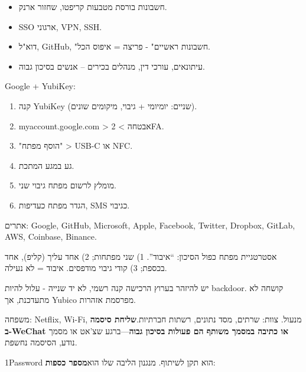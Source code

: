 
\begin{itemize}
  \item חשבונות בורסת מטבעות קריפטו, שחזור ארנק.
  \item SSO ארגוני, VPN, SSH.
  \item דוא"ל, GitHub, "חשבונות ראשיים" - פריצה = איפוס הכל.
  \item עיתונאים, עורכי דין, מנהלים בכירים – אנשים בסיכון גבוה.
\end{itemize}


Google + YubiKey:

\begin{enumerate}
  \item קנה YubiKey (שניים: יומיומי + גיבוי, מיקומים שונים).
  \item myaccount.google.com > אבטחה > 2FA.
  \item "הוסף מפתח" > USB-C או NFC.
  \item גע במגע המתכת.
  \item מומלץ לרשום מפתח גיבוי שני.
  \item הגדר מפתח כעדיפות, SMS כגיבוי.
\end{enumerate}

אתרים: Google, GitHub, Microsoft, Apple, Facebook, Twitter, Dropbox, GitLab, AWS, Coinbase, Binance.

\begin{tcbinfo}{אסטרטגיית מפתח כפול}
הסיכון: “איבוד”. 1) שני מפתחות; 2) אחד עליך (קליפ), אחד בכספת; 3) קודי גיבוי מודפסים. איבוד = לא נעילה.

\end{tcbinfo}

\begin{tcbwarn}{יש להיזהר בערוץ הרכישה}
קנה רשמי, לא יד שנייה - עלול להיות backdoor. קושחה לא מתעדכנת, אך Yubico מפרסמת אזהרות.

\end{tcbwarn}


משפחה: Netflix, Wi-Fi, מנעול. צוות: שרתים, מסד נתונים, רשתות חברתיות.\textbf{שליחת סיסמה ב-WeChat או כתיבה במסמך משותף הם פעולות בסיכון גבוה}—ברגע שצ'אט או מסמך נודע, הסיסמה נחשפת.


1Password הוא תקן לשיתוף. מנגנון הליבה שלו הוא\textbf{מספר כספות}:

